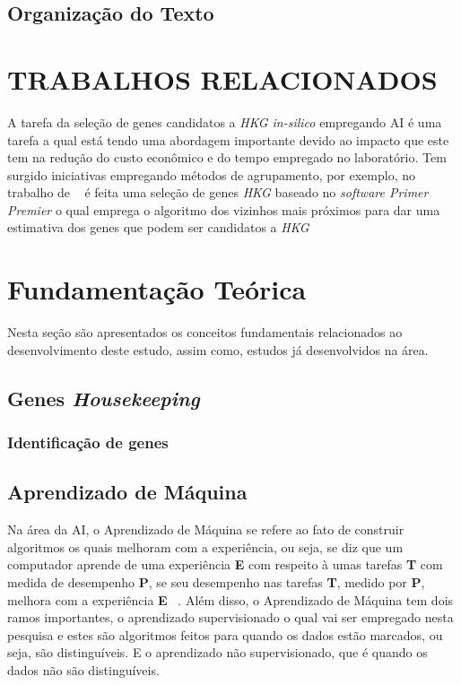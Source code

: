 \documentclass[
	12pt,				%
	openright,			%
	oneside,			%
	a4paper,			%
	english,			%
	brazil				%
	]{abntex2}
\begin{document}
\section{Organização do Texto}

\chapter{TRABALHOS RELACIONADOS}
A tarefa da seleção de genes candidatos a \textit{HKG in-silico} empregando AI é uma tarefa a qual está tendo uma abordagem importante devido ao impacto que este tem na redução do custo econômico e do tempo empregado no laboratório. Tem surgido iniciativas empregando métodos de agrupamento, por exemplo, no trabalho de ~\cite{xia2017identification} é feita uma seleção de genes \textit{HKG} baseado no \textit{software Primer Premier} o qual emprega o algoritmo dos vizinhos mais próximos para dar uma estimativa dos genes que podem ser candidatos a \textit{HKG}

\chapter{Fundamentação Teórica}

Nesta seção são apresentados os conceitos fundamentais relacionados ao desenvolvimento deste estudo, assim como, estudos já desenvolvidos na área.

\section{Genes \textit{Housekeeping}}

\subsection{Identificação de genes}
\section{Aprendizado de Máquina}
Na área da AI, o Aprendizado de Máquina se refere ao fato de construir algoritmos os quais melhoram com a experiência, ou seja, se diz que um computador aprende de uma experiência \textbf{E} com respeito à umas tarefas \textbf{T} com medida de desempenho \textbf{P}, se seu desempenho nas tarefas \textbf{T}, medido por \textbf{P}, melhora com a experiência \textbf{E} ~\cite{jordan2015machine}. Além disso, o Aprendizado de Máquina tem dois ramos importantes, o aprendizado supervisionado o qual vai ser empregado nesta pesquisa e estes são algoritmos feitos para quando os dados estão marcados, ou seja, são distinguíveis. E o aprendizado não supervisionado, que é quando os dados não são distinguíveis.
\end{document}
